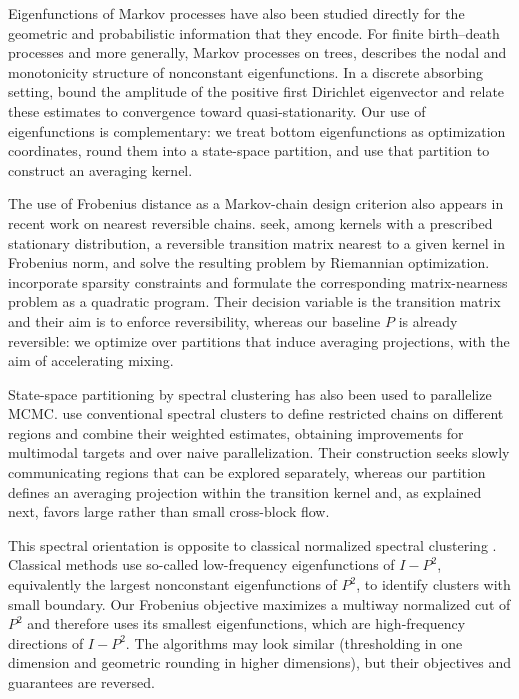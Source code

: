 \documentclass[11pt]{article}
\newcommand{\1}{\mathbf{1}}
\begin{document}
Eigenfunctions of Markov processes have also been studied directly
for the geometric and probabilistic information that they encode.
For finite birth--death processes and more generally, Markov
processes on trees, \citet{Miclo2008EigenfunctionsTrees} describes the
nodal and monotonicity structure of nonconstant eigenfunctions.
In a discrete absorbing setting,
\citet{DiaconisMiclo2016DirichletAmplitude} bound the amplitude of the
positive first Dirichlet eigenvector and relate these estimates to
convergence toward quasi-stationarity.  Our use of eigenfunctions is
complementary: we treat bottom eigenfunctions as optimization
coordinates, round them into a state-space partition, and use that
partition to construct an averaging kernel.

The use of Frobenius distance as a Markov-chain design criterion also
appears in recent work on nearest reversible chains.
\citet{DurastanteGnazzoMeini2025NearestReversible} seek, among kernels
with a prescribed stationary distribution, a reversible transition
matrix nearest to a given kernel in Frobenius norm, and solve the
resulting problem by Riemannian optimization.
\citet{CipollaDurastanteGnazzoMeini2026NearestReversible} incorporate
sparsity constraints and formulate the corresponding matrix-nearness
problem as a quadratic program.  Their decision variable is the
transition matrix and their aim is to enforce reversibility, whereas
our baseline $P$ is already reversible: we optimize over partitions
that induce averaging projections, with the aim of accelerating
mixing. 

State-space partitioning by spectral clustering has also been used to
parallelize MCMC.  \citet{BasseSmithPillai2016} use conventional
spectral clusters to define restricted chains on different regions and
combine their weighted estimates, obtaining improvements for
multimodal targets and over naive parallelization.  Their construction
seeks slowly communicating regions that can be explored separately,
whereas our partition defines an averaging projection within the
transition kernel and, as explained next, favors large rather than
small cross-block flow.

This spectral orientation is opposite to classical normalized
spectral clustering \citep{ShiMalik2000,NgJordanWeiss2001}.  Classical
methods use so-called low-frequency eigenfunctions of $I-P^2$, equivalently the
largest nonconstant eigenfunctions of $P^2$, to identify clusters with
small boundary.  Our Frobenius objective maximizes a multiway
normalized cut of $P^2$ and therefore uses its smallest eigenfunctions,
which are high-frequency directions of $I-P^2$.  The algorithms may
look similar (thresholding in one dimension and geometric rounding in
higher dimensions), but their objectives and guarantees are reversed.
\end{document}
